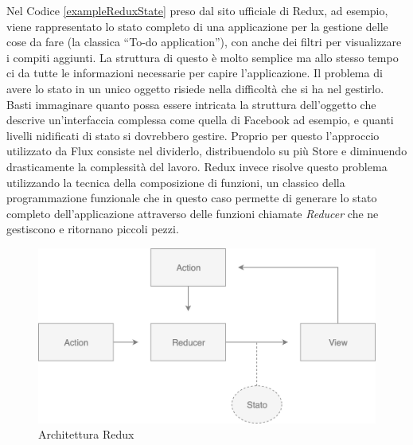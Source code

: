 Nel Codice \ref{exampleReduxState} preso dal sito ufficiale di Redux, ad esempio, viene rappresentato lo stato completo di una applicazione per la gestione delle cose da fare (la classica “To-do application”), con anche dei filtri per visualizzare i compiti aggiunti.
La struttura di questo è molto semplice ma allo stesso tempo ci da tutte le informazioni necessarie per capire l'applicazione. Il problema di avere lo stato in un unico oggetto risiede nella difficoltà che si ha nel gestirlo. Basti immaginare quanto possa essere intricata la struttura dell'oggetto che descrive un'interfaccia complessa come quella di Facebook ad esempio, e quanti livelli nidificati di stato si dovrebbero gestire. Proprio per questo l'approccio utilizzato da Flux consiste nel dividerlo, distribuendolo su più Store e diminuendo drasticamente la complessità del lavoro. Redux invece risolve questo problema utilizzando la tecnica della composizione di funzioni, un classico della programmazione funzionale che in questo caso permette di generare lo stato completo dell'applicazione attraverso delle funzioni chiamate \textit{Reducer} che ne gestiscono e ritornano piccoli pezzi. 

\begin{figure}[h]
\centering
\vspace*{0.5cm} 
\includegraphics[width=11.5cm]{./images/ReduxWorkflow}
\caption{Architettura Redux}
\label{ReduxWorkflow}
\vspace*{0.5cm} 
\end{figure}

